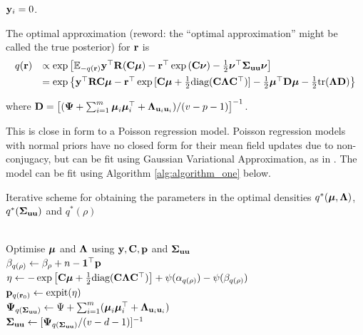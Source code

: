 \documentclass{amsart}[12pt]
\newcommand{\joc}[1]{{\color{red}#1}}
\begin{document}
\noindent 
{} ${\bf y}_i = 0$.


\noindent The optimal approximation \joc{(reword: the ``optimal approximation'' might be called the true posterior)} for ${\bf r}$ is
$$
\begin{array}{rl}
	q({\bf r}) & \propto \exp \left [ {\mathbb E}_{-q({\bf r})}{\bf y}^\top{\bf R}({\bf C}{\boldsymbol \mu}) - {\bf r}^\top\exp{({\bf C}{\boldsymbol\nu})}-\tfrac{1}{2} {\boldsymbol \nu}^\top {\boldsymbol\Sigma}_{{\bf u} {\bf u}} {\boldsymbol \nu} \right ]                                                  \\ [1ex]
	       & = \exp{ \left\{ {\bf y}^\top{\bf R}{\bf C}{\boldsymbol\mu}- {\bf r}^\top \exp{[{\bf C}{\boldsymbol\mu}+  \tfrac{1}{2} \text{diag}({\bf C}{\boldsymbol\Lambda}{\bf C}^\top)]} -  \tfrac{1}{2} {\boldsymbol\mu}^\top {\bf D}{\boldsymbol\mu}-  \tfrac{1}{2} \text{tr}({\boldsymbol\Lambda}{\bf D}) \right\} } 
\end{array}
$$

\noindent where ${\bf D} = \left[ ({\boldsymbol \Psi} + \sum_{i=1}^m {\boldsymbol \mu}_i {\boldsymbol \mu}_i^\top + {\boldsymbol \Lambda}_{{\bf u}_i{\bf u}_i}) / (v - p - 1) \right]^{-1}$. 

This is close in form to a Poisson regression model. Poisson regression models with normal priors
have no closed form for their mean field updates due to non- conjugacy, but can be fit using Gaussian
Variational Approximation, as in \citep{Ormerod2012}. The model can be fit using Algorithm
\ref{alg:algorithm_one} below.

\begin{algorithm}
	\caption[Algorithm 1]{Iterative scheme for obtaining the parameters in the
		optimal densities $q^*({\boldsymbol \mu}, {\boldsymbol \Lambda})$, $q^*({\boldsymbol \Sigma}_{{\bf u} {\bf u}})$ and $q^*(\rho)$}
	\label{alg:algorithm_one}
	\begin{algorithmic}
		 \\[1ex]
		\STATE Optimise ${\boldsymbol \mu}$ and ${\boldsymbol \Lambda}$ using ${\bf y}, {\bf C}, {\bf p}$ and ${\boldsymbol \Sigma}_{{\bf u} {\bf u}}$ \\[1ex]
		\STATE $\beta_{q(\rho)} \leftarrow \beta_\rho + n - {\bf 1}^\top{\bf p}$ \\[1ex]
		\STATE $\eta \leftarrow -\exp \left [ {\bf C} {\boldsymbol \mu} + \tfrac{1}{2} \text{diag}{({\bf C}{\boldsymbol\Lambda}{\bf C}^\top)} \right ] + \psi{(\alpha_{q{(\rho)}})} - \psi{(\beta_{q{(\rho)}})}$ \\[1ex]
			\STATE ${\bf p}_{q({\bf r}_0)} \leftarrow \text{expit} (\eta)$ \\[1ex]
			\STATE ${\boldsymbol \Psi}_{q({\boldsymbol \Sigma}_{{\bf u} {\bf u}})} \leftarrow \Psi + \sum_{i=1}^m ({\boldsymbol \mu}_i {\boldsymbol \mu}_i^\top + {\boldsymbol \Lambda}_{{{\bf u}}_i {{\bf u}}_i})$ \\[1ex]
			\STATE ${\boldsymbol \Sigma}_{{\bf u}{\bf u}} \leftarrow [{\boldsymbol \Psi}_{q({\boldsymbol \Sigma}_{{\bf u} {\bf u}})}/(v - d - 1)]^{-1}$
			\ENDWHILE
			\end{algorithmic}
			\end{algorithm}
						
\end{document}
